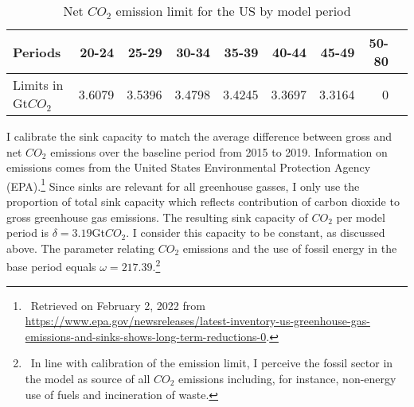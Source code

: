  \begin{table}[hh!!!!!]
	\begin{center}
		\captionsetup{width=0.9\textwidth}
		\caption{Net $CO_2$ emission limit for the US by model period}
		\label{tab:emlimit}
		\begin{tabular}{l|rrrrrrrr}
			\hline 
			\hline
			Periods&20-24&25-29&30-34&35-39&40-44&45-49&50-80\\
			\hline	
			Limits in Gt$CO_2$&3.6079&3.5396&3.4798&3.4245&3.3697&3.3164&0\\
			\hline \hline
		 			
	\end{tabular}
\end{center}
\end{table}	
 

 
 I calibrate the sink capacity to match the average difference between gross and net $CO_2$ emissions over the baseline period from 2015 to 2019.  Information on emissions comes from the United States Environmental Protection Agency (EPA).\footnote{\ Retrieved on February 2, 2022 from  \url{https://www.epa.gov/newsreleases/latest-inventory-us-greenhouse-gas-emissions-and-sinks-shows-long-term-reductions-0}. } Since sinks are relevant for all greenhouse gasses, I only use the proportion of total sink capacity which reflects contribution of carbon dioxide to gross greenhouse gas emissions. The resulting sink capacity of $CO_2$ per model period is $\delta=3.19$Gt$CO_2$.  I consider this capacity to be constant, as discussed above. 
 The parameter relating $CO_2$ emissions and the use of fossil energy in the base period equals $\omega=217.39$.\footnote{\  In line with calibration of the emission limit, I perceive the fossil sector in the model as source of all $CO_2$ emissions including, for instance, non-energy use of fuels and incineration of waste.}  
 
